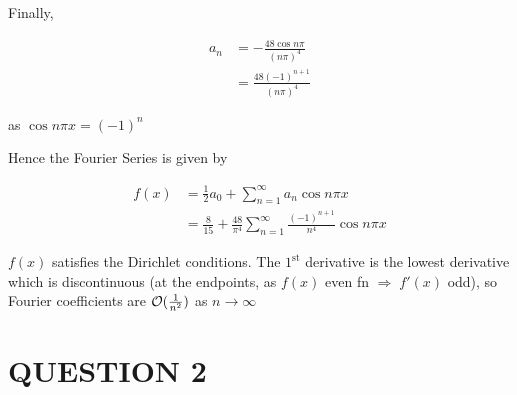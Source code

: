 \documentclass[a4paper]{article}
\begin{document}
Finally,

\begin{align*}
a_{n} & = - \frac{48 \cos n \pi }{(n \pi)^{4}} \\
& = \frac{48(-1)^{n+1}}{(n \pi)^{4}}
\end{align*}

as $ \cos n \pi x = (-1)^{n}$ 

Hence the Fourier Series is given by

\begin{align*}
f(x) & = \frac{1}{2}a_{0} + \sum_{n=1}^{\infty} a_{n} \cos n \pi x \\
& = \frac{8}{15} + \frac{48}{\pi^{4}}\sum_{n=1}^{\infty} \frac{(-1)^{n+1}}{n^{4}} \cos n \pi x
\end{align*}

\begin{center}
\end{center}


$ f(x) $ satisfies the Dirichlet conditions. The $ 1^{\text{st}} $ derivative is the lowest derivative which is discontinuous (at the endpoints, as $ f(x) $ even fn $ \Rightarrow \; f'(x) $ odd), so Fourier coefficients are $ \mathcal{O}(\frac{1}{n^{2}}) $ as $ n \to \infty $

\section{QUESTION 2}
\end{document}
